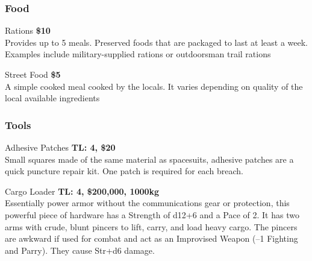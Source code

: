 \begin{multicols}{2}
\subsubsection{Food}

\begin{genericsection}{Rations}
\textbf{\$10}\\
Provides up to 5 meals. Preserved foods that are packaged to last at least a week. Examples include military-supplied rations or outdoorsman trail rations
\end{genericsection}

\begin{genericsection}{Street Food}
\textbf{\$5}\\
A simple cooked meal cooked by the locals. It varies depending on quality of the local available ingredients
\end{genericsection}

\subsubsection{Tools}

\begin{genericsection}{Adhesive Patches}
\textbf{TL: 4, \$20}\\
Small squares made of the same material as spacesuits, adhesive patches are a quick puncture repair kit. One patch is required for each breach.
\end{genericsection}

\begin{genericsection}{Cargo Loader}
\textbf{TL: 4, \$200,000, 1000kg}\\
Essentially power armor without the communications gear or protection, this powerful piece of hardware has a Strength of d12+6 and a Pace of 2. It has two arms with crude, blunt pincers to lift, carry, and load heavy cargo. The pincers are awkward if used for combat and act as an Improvised Weapon (–1 Fighting and Parry). They cause Str+d6 damage.
\end{genericsection}

\end{multicols}

